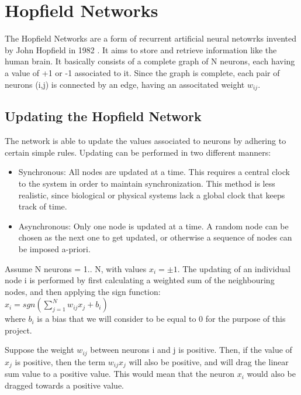 \section{Hopfield Networks}
The Hopfield Networks are a form of recurrent artificial neural netowrks invented by John Hopfield in 1982 \cite{hopfield_wiki}. It aims to store and retrieve information like the human brain. It basically consists of a complete graph of N neurons, each having a value of +1 or -1 associated to it. Since the graph is complete, each pair of neurons (i,j) is connected by an edge, having an associtated weight \( w_{ij}\). 

\subsection{Updating the Hopfield Network}

The network is able to update the values associated to neurons by adhering to certain simple rules. Updating can be performed in two different manners:
\begin{itemize}
 \item Synchronous: All nodes are updated at a time. This requires a central clock to the system in order to maintain synchronization. This method is less realistic, since biological or physical systems lack a global clock that keeps track of time. 
 \item Asynchronous: Only one node is updated at a time. A random node can be chosen as the next one to get updated, or otherwise a sequence of nodes can be imposed a-priori.
\end{itemize}

Assume N neurons = 1.. N, with values \(x_{i} = \pm1\). The updating of an individual node i is performed by first calculating a weighted sum of the neighbouring nodes, and then applying the sign function:\\

 \(x_{i} = sgn(\sum_{j=1}^{N}w_{ij}x_{j} + b_{i})\)\\

where \( b_{i} \) is a bias that we will consider to be equal to 0 for the purpose of this project.

Suppose the weight \( w_{ij}\) between neurons i and j is positive. Then, if the value of \( x_{j} \) is positive, then the term \( w_{ij}x_{j} \) will also be positive, and will drag the linear sum value to a positive value. This would mean that the neuron \( x_{i} \) would also be dragged towards a positive value. 

